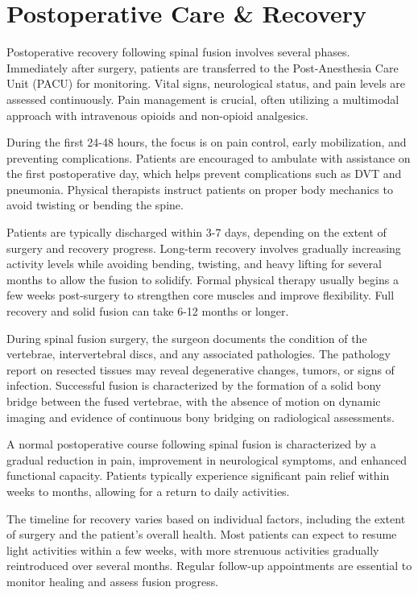 \section*{Postoperative Care \& Recovery}
Postoperative recovery following spinal fusion involves several phases. Immediately after surgery, patients are transferred to the Post-Anesthesia Care Unit (PACU) for monitoring. Vital signs, neurological status, and pain levels are assessed continuously. Pain management is crucial, often utilizing a multimodal approach with intravenous opioids and non-opioid analgesics.

During the first 24-48 hours, the focus is on pain control, early mobilization, and preventing complications. Patients are encouraged to ambulate with assistance on the first postoperative day, which helps prevent complications such as DVT and pneumonia. Physical therapists instruct patients on proper body mechanics to avoid twisting or bending the spine. 

Patients are typically discharged within 3-7 days, depending on the extent of surgery and recovery progress. Long-term recovery involves gradually increasing activity levels while avoiding bending, twisting, and heavy lifting for several months to allow the fusion to solidify. Formal physical therapy usually begins a few weeks post-surgery to strengthen core muscles and improve flexibility. Full recovery and solid fusion can take 6-12 months or longer.

During spinal fusion surgery, the surgeon documents the condition of the vertebrae, intervertebral discs, and any associated pathologies. The pathology report on resected tissues may reveal degenerative changes, tumors, or signs of infection. Successful fusion is characterized by the formation of a solid bony bridge between the fused vertebrae, with the absence of motion on dynamic imaging and evidence of continuous bony bridging on radiological assessments.

A normal postoperative course following spinal fusion is characterized by a gradual reduction in pain, improvement in neurological symptoms, and enhanced functional capacity. Patients typically experience significant pain relief within weeks to months, allowing for a return to daily activities. 

The timeline for recovery varies based on individual factors, including the extent of surgery and the patient's overall health. Most patients can expect to resume light activities within a few weeks, with more strenuous activities gradually reintroduced over several months. Regular follow-up appointments are essential to monitor healing and assess fusion progress.

